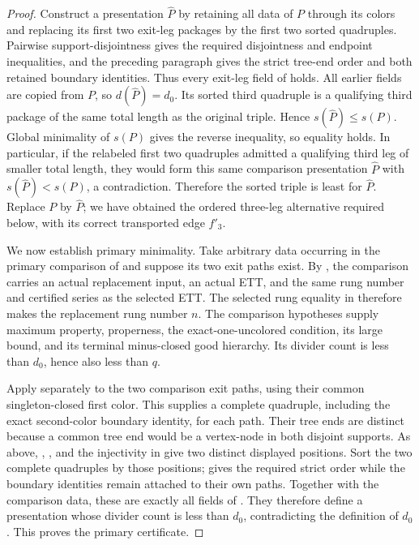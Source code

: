 \begin{proof}
Construct a presentation $\widehat P$ by retaining all data of $P$
through its colors and replacing its first two exit-leg packages by the
first two sorted quadruples.  Pairwise support-disjointness gives the
required disjointness and endpoint inequalities, and the preceding
paragraph gives the strict tree-end order and both retained boundary
identities.  Thus every exit-leg field of
 holds.  All earlier fields are copied
from $P$, so $d(\widehat P)=d_0$.  Its sorted third quadruple is a
qualifying third package of the same total length as the original
triple.  Hence $s(\widehat P)\leq s(P)$.  Global minimality of $s(P)$
gives the reverse inequality, so equality holds.  In particular, if the
relabeled first two quadruples admitted a qualifying third leg of
smaller total length, they would form this same comparison presentation
$\widehat P$ with $s(\widehat P)<s(P)$, a contradiction.  Therefore the
sorted triple is least for $\widehat P$.  Replace $P$ by $\widehat P$;
we have obtained the ordered three-leg alternative required below,
with its correct transported edge $f'_3$.

We now establish primary minimality.  Take arbitrary data occurring in
the primary comparison of  and suppose its
two exit paths exist.  By
, the comparison carries an
actual replacement input, an actual ETT, and the same rung number and
certified series as the selected ETT.  The selected rung equality in
 therefore makes the replacement rung
number $n$.  The comparison hypotheses supply maximum property,
properness, the exact-one-uncolored condition, its large bound, and its
terminal minus-closed good hierarchy.  Its divider count is less than
$d_0$, hence also less than $q$.

Apply  separately to the two
comparison exit paths, using their common singleton-closed first color.
This supplies a complete quadruple, including the exact second-color
boundary identity, for each path.  Their tree ends are distinct because
a common tree end would be a vertex-node in both disjoint supports.
As above, , , and
the injectivity in  give two distinct displayed
positions.  Sort the two complete quadruples by those positions;
 gives the required strict order while the
boundary identities remain attached to their own paths.  Together with
the comparison data, these are exactly all fields of
.  They therefore define a
presentation whose divider count is less than $d_0$, contradicting the
definition of $d_0$.  This proves the primary certificate.


\end{proof}
